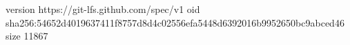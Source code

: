 version https://git-lfs.github.com/spec/v1
oid sha256:54652d4019637411f8757d8d4c02556efa5448d6392016b9952650bc9abced46
size 11867

